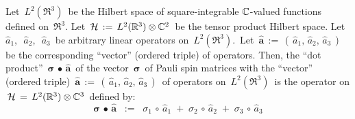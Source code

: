 \vskip 0.5cm
\begin{definition}
\mbox{}
\vskip 0.15cm
\noindent
Let
\,$L^{2}(\Re^{3})$\,
be the Hilbert space of square-integrable $\mathbb{C}$-valued functions defined on \,$\Re^{3}$.
\vskip 0.1cm
\noindent
Let
\,$\mathcal{H} \, := \, L^{2}(\mathbb{R}^{3}) \otimes \mathbb{C}^{2}$\,
be the tensor product Hilbert space.
\vskip 0.1cm
\noindent
Let
\,$\widehat{a}_{1}$,\, 
\,$\widehat{a}_{2}$,\, 
\,$\widehat{a}_{3}$\,
be arbitrary {\color{red}linear} operators on \,$L^{2}(\Re^{3})$.\,
\vskip 0.1cm
\noindent
Let
\,$\widehat{\boldsymbol{a}} \, := \, \left(\,\widehat{a}_{1},\,\widehat{a}_{2},\,\widehat{a}_{3}\,\right)$\,
be the corresponding ``vector'' (ordered triple) of operators.
\vskip 0.1cm
\noindent
Then, the ``dot product''
\,$\boldsymbol{\sigma} \,\bullet\, \widehat{\mathbf{a}}$\,
of the vector
\,$\boldsymbol{\sigma}$\,
of Pauli spin matrices with the ``vector'' (ordered triple)
\,$\widehat{\boldsymbol{a}} \, := \, \left(\,\widehat{a}_{1},\,\widehat{a}_{2},\,\widehat{a}_{3}\,\right)$\,
of operators on \,$L^{2}(\Re^{3})$\, is the operator on
\,$\mathcal{H} \, = \, L^{2}(\mathbb{R}^{3}) \otimes \mathbb{C}^{3}$\,
defined by:
\begin{equation*}
\boldsymbol{\sigma} \,\bullet\, \widehat{\mathbf{a}}
\;\; := \;\;
    \sigma_{1} \,\circ\, \widehat{a}_{1}
    \; + \;
    \sigma_{2} \,\circ\, \widehat{a}_{2}
    \; + \;
    \sigma_{3} \,\circ\, \widehat{a}_{3}
\end{equation*}
\end{definition}

